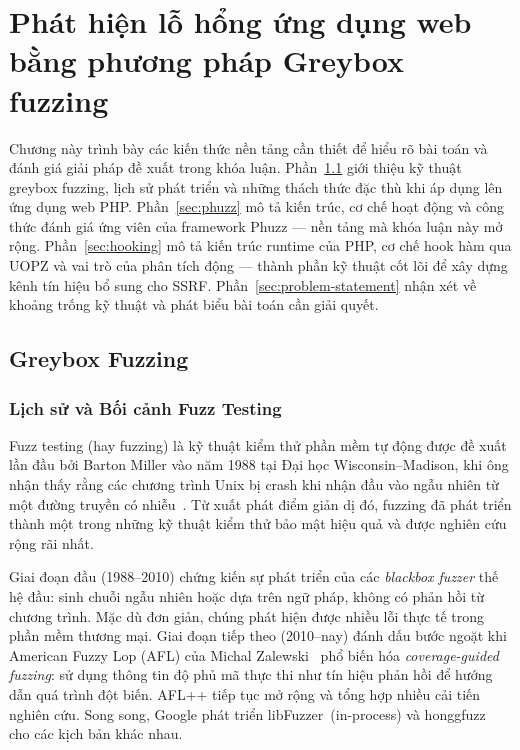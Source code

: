 ﻿\chapter{Phát hiện lỗ hổng ứng dụng web bằng phương pháp Greybox fuzzing}


Chương này trình bày các kiến thức nền tảng cần thiết để hiểu rõ bài toán
và đánh giá giải pháp đề xuất trong khóa luận.
Phần~\ref{sec:greybox-fuzzing} giới thiệu kỹ thuật greybox fuzzing, lịch sử
phát triển và những thách thức đặc thù khi áp dụng lên ứng dụng web PHP.
Phần~\ref{sec:phuzz} mô tả kiến trúc, cơ chế hoạt động và công thức đánh giá
ứng viên của framework Phuzz --- nền tảng mà khóa luận này mở rộng.
Phần~\ref{sec:hooking} mô tả kiến trúc runtime của PHP, cơ chế hook hàm qua
UOPZ và vai trò của phân tích động --- thành phần kỹ thuật cốt lõi để xây
dựng kênh tín hiệu bổ sung cho SSRF.
Phần~\ref{sec:problem-statement} nhận xét về khoảng trống kỹ thuật và phát
biểu bài toán cần giải quyết.

\section{Greybox Fuzzing}
\label{sec:greybox-fuzzing}

\subsection{Lịch sử và Bối cảnh Fuzz Testing}

Fuzz testing (hay fuzzing) là kỹ thuật kiểm thử phần mềm tự động được đề
xuất lần đầu bởi Barton Miller vào năm 1988 tại Đại học Wisconsin--Madison,
khi ông nhận thấy rằng các chương trình Unix bị crash khi nhận đầu vào ngẫu
nhiên từ một đường truyền có nhiễu~\cite{miller1990empirical, li2018fuzzing}. Từ xuất phát điểm
giản dị đó, fuzzing đã phát triển thành một trong những kỹ thuật kiểm thử
bảo mật hiệu quả và được nghiên cứu rộng rãi nhất.

Giai đoạn đầu (1988--2010) chứng kiến sự phát triển của các
\emph{blackbox fuzzer} thế hệ đầu: sinh chuỗi ngẫu nhiên hoặc dựa trên
ngữ pháp, không có phản hồi từ chương trình. Mặc dù đơn giản, chúng phát
hiện được nhiều lỗi thực tế trong phần mềm thương mại. Giai đoạn tiếp theo
(2010--nay) đánh dấu bước ngoặt khi American Fuzzy Lop (AFL) của Michal
Zalewski~\cite{zalewski2014afl} phổ biến hóa \emph{coverage-guided fuzzing}:
sử dụng thông tin độ phủ mã thực thi như tín hiệu phản hồi để hướng dẫn
quá trình đột biến. AFL++ \cite{fioraldi2020afl} tiếp tục mở rộng và tổng
hợp nhiều cải tiến nghiên cứu. Song song, Google phát triển
libFuzzer~(in-process) và honggfuzz~\cite{google2023honggfuzz} cho các
kịch bản khác nhau.

